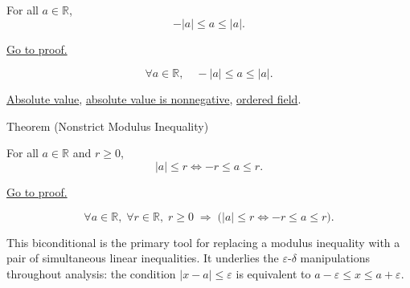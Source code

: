 \begin{theorem}
\label{thm:absolute-value-bounds}
For all $a \in \mathbb{R}$,
\[
  -\lvert a \rvert \le a \le \lvert a \rvert.
\]
\end{theorem}



\begin{remark*}[Proof]
\hyperref[prf:absolute-value-bounds]{Go to proof.}
\end{remark*}

\begin{remark*}
\[
  \forall a \in \mathbb{R},\quad
  -\lvert a \rvert \le a \le \lvert a \rvert.
\]
\end{remark*}

\begin{dependencies}
\hyperref[def:absolute-value]{Absolute value},
\hyperref[thm:absolute-value-nonneg]{absolute value is nonnegative},
\hyperref[def:real-ordered-field]{ordered field}.
\end{dependencies}


\begin{theorembox}{Theorem (Nonstrict Modulus Inequality)}
\begin{theorem}
\label{thm:absolute-value-le-iff}
For all $a \in \mathbb{R}$ and $r \ge 0$,
\[
  \lvert a \rvert \le r \iff -r \le a \le r.
\]
\end{theorem}
\end{theorembox}



\begin{remark*}[Proof]
\hyperref[prf:absolute-value-le-iff]{Go to proof.}
\end{remark*}

\begin{remark*}
\[
  \forall a \in \mathbb{R},\;
  \forall r \in \mathbb{R},\;
  r \ge 0 \;\Rightarrow\;
  \bigl(\lvert a \rvert \le r \iff -r \le a \le r\bigr).
\]
\end{remark*}

\begin{remark*}[Interpretation]
This biconditional is the primary tool for replacing a modulus inequality
with a pair of simultaneous linear inequalities.  It underlies the
$\varepsilon$-$\delta$ manipulations throughout analysis: the condition
$\lvert x - a \rvert \le \varepsilon$ is equivalent to
$a - \varepsilon \le x \le a + \varepsilon$.
\end{remark*}


